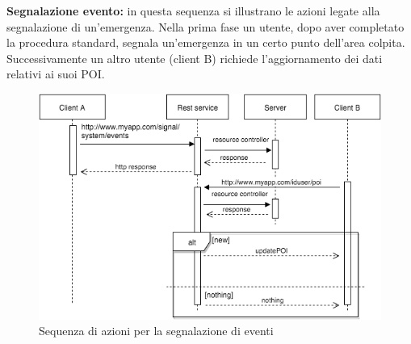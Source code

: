 \textbf{Segnalazione evento:} in questa sequenza si illustrano le azioni legate alla segnalazione di un'emergenza. Nella prima fase un utente, dopo aver completato la procedura standard, segnala un'emergenza in un certo punto dell'area colpita. Successivamente un altro utente (client B) richiede l'aggiornamento dei dati relativi ai suoi POI.
 \begin{figure}[H]
	\centering
	\includegraphics[scale=0.7]{Implementazione/signal.png}
	\caption{Sequenza di azioni per la segnalazione di eventi }
	\label{fig:sig}
\end{figure}
